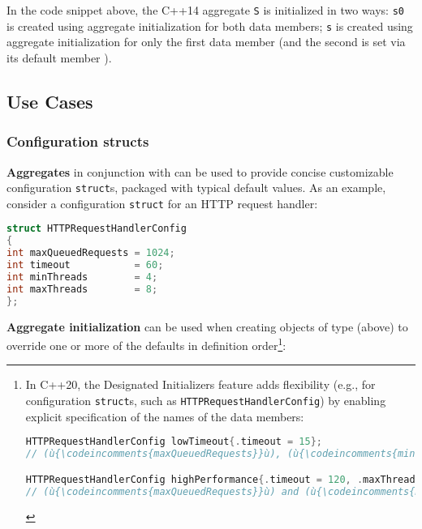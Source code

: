\noindent In the code snippet above, the C++14 aggregate \texttt{S} is initialized
in two ways: \texttt{s0} is created using aggregate initialization for
both data members; \texttt{s} is created using aggregate
initialization for only the first data member (and the second is set via its
default member ).

\subsection[Use Cases]{Use Cases}\label{use-cases}

\subsubsection[Configuration \tt{struct}s]{Configuration {\SubsubsecCode struct}s}\label{configuration-structs}

\textbf{Aggregates} in conjunction with  can be used to provide concise customizable
configuration \texttt{struct}s, packaged with typical default values. As
an example, consider a configuration \texttt{struct} for an HTTP request
handler:

\begin{lstlisting}[language=C++]
struct HTTPRequestHandlerConfig
{
int maxQueuedRequests = 1024;
int timeout           = 60;
int minThreads        = 4;
int maxThreads        = 8;
};
\end{lstlisting}

\noindent \textbf{Aggregate initialization} can be used when creating objects of
type  (above) to override one or more
of the defaults in definition order{\cprotect\footnote{In C++20, the
Designated Initializers feature adds flexibility (e.g., for
configuration \texttt{struct}s, such as
\texttt{HTTPRequestHandlerConfig}) by enabling explicit specification
of the names of the data members:

\begin{lstlisting}[language=C++, basicstyle={\ttfamily\footnotesize}]
HTTPRequestHandlerConfig lowTimeout{.timeout = 15};
// (ù{\codeincomments{maxQueuedRequests}}ù), (ù{\codeincomments{minThreads}}ù), and (ù{\codeincomments{maxThreads}}ù) have their default value.

HTTPRequestHandlerConfig highPerformance{.timeout = 120, .maxThreads = 16};
// (ù{\codeincomments{maxQueuedRequests}}ù) and (ù{\codeincomments{minThreads}}ù) have their default value.
\end{lstlisting}
}}:

